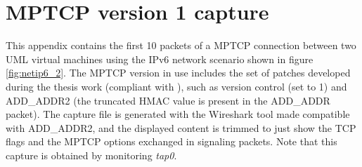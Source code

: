 \chapter{MPTCP version 1 capture}
\label{app:b}

This appendix contains the first 10 packets of a MPTCP connection between two UML virtual machines using the IPv6 network scenario shown in figure \ref{fig:netip6_2}. The MPTCP version in use includes the set of patches developed during the thesis work (compliant with ), such as version control (set to 1) and ADD\_ADDR2 (the truncated HMAC value is present in the ADD\_ADDR packet). The capture file is generated with the Wireshark tool made compatible with ADD\_ADDR2, and the displayed content is trimmed to just show the TCP flags and the MPTCP options exchanged in signaling packets. Note that this capture is obtained by monitoring \textit{tap0}.

